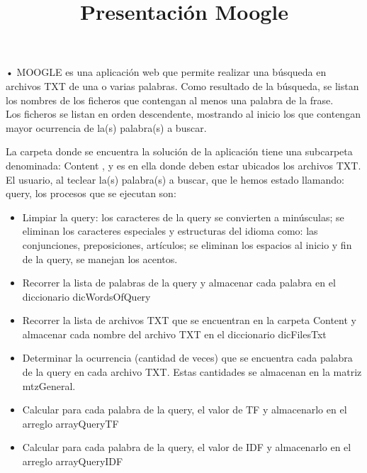 \documentclass[11pt]{beamer}
\title{Presentación Moogle}
\begin{document}
\begin{frame}
\titlepage

\end{frame}

\begin{frame}{•}
MOOGLE es una aplicación web que permite realizar una búsqueda en archivos TXT de una o 
varias palabras. Como resultado de la búsqueda, se listan los nombres de los ficheros que 
contengan al menos una palabra de la frase.\\

Los ficheros se listan en orden descendente, mostrando al inicio los que contengan mayor 
ocurrencia de la(s) palabra(s) a buscar.
\end{frame}

\begin{frame}
La carpeta donde se encuentra la solución de la aplicación tiene una subcarpeta denominada: 
Content , y es en ella donde deben estar ubicados los archivos TXT.\\

El usuario, al teclear la(s) palabra(s) a buscar, que le hemos estado llamando: query, los procesos 
que se ejecutan son:\\

\begin{itemize}
 \item Limpiar la query: los caracteres de la query se convierten a minúsculas; se eliminan los 
caracteres especiales y estructuras del idioma como: las conjunciones, preposiciones, 
artículos; se eliminan los espacios al inicio y fin de la query, se manejan los acentos.\\

\item Recorrer la lista de palabras de la query y almacenar cada palabra en el diccionario 
dicWordsOfQuery
\end{itemize}
\end{frame}

\begin{frame}
\begin{itemize}
\item Recorrer la lista de archivos TXT que se encuentran en la carpeta Content y almacenar
cada nombre del archivo TXT en el diccionario dicFilesTxt\\

\item Determinar la ocurrencia (cantidad de veces) que se encuentra cada palabra de la query
en cada archivo TXT. Estas cantidades se almacenan en la matriz mtzGeneral.\\

\item Calcular para cada palabra de la query, el valor de TF y almacenarlo en el arreglo 
arrayQueryTF\\

\item Calcular para cada palabra de la query, el valor de IDF y almacenarlo en el arreglo 
arrayQueryIDF\\
\end{itemize}
\end{frame}
\end{document}
